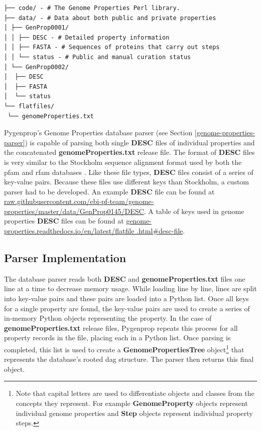\begin{verbatim}
├── code/ - # The Genome Properties Perl library.
├── data/ - # Data about both public and private properties
│ ├── GenProp0001/
│ │ ├── DESC - # Detailed property information
│ │ ├── FASTA - # Sequences of proteins that carry out steps
│ │ └── status - # Public and manual curation status
│ └── GenProp0002/
│  ├── DESC
│  ├── FASTA
│  └── status
└── flatfiles/
 └── genomeProperties.txt
\end{verbatim}

Pygenprop's Genome Properties database parser (see Section 
\ref{genome-properties-parser}) is capable of parsing both single \textbf{DESC} 
files of individual properties and the concatenated 
\textbf{genomeProperties.txt} release file. The format of \textbf{DESC} files is 
very similar to the Stockholm sequence alignment format used by both the 
\gls{pfam} and \gls{rfam} databases \cite{bateman2004pfam, griffiths2003rfam}. Like 
these file types, \textbf{DESC} files consist of a series of key-value pairs. 
Because these files use different keys than Stockholm, a custom parser had to be 
developed. An example \textbf{DESC} file can be found at 
\href{http://raw.githubusercontent.com/ebi-pf-team/genome-properties/master/data/GenProp0145/DESC}{raw.githubusercontent.com/ebi-pf-team/genome-properties/master/data/GenProp0145/DESC}. 
A table of keys used in  genome properties \textbf{DESC} files can be found at 
\href{https://genome-properties.readthedocs.io/en/latest/flatfile.html#desc-file}{genome-properties.readthedocs.io/en/latest/flatfile .html\#desc-file}.

\subsection{Parser Implementation}

The database parser reads both \textbf{DESC} and \textbf{genomeProperties.txt} 
files one line at a time to decrease memory usage. While loading line by line, 
lines are split into key-value pairs and these pairs are loaded into a Python 
list. Once all keys for a single property are found, the key-value pairs are 
used to create a series of in-memory Python objects representing the property. 
In the case of \textbf{genomeProperties.txt} release files, Pygenprop repeats 
this process for all property records in the file, placing each in a Python 
list.  Once parsing is completed, this list is used to create a 
\textbf{GenomePropertiesTree} object\footnote{Note that capital letters are used 
to differentiate objects and classes from the concepts they represent. For 
example \textbf{GenomeProperty} objects represent individual genome properties 
and \textbf{Step} objects represent individual property steps.} that represents 
the database's rooted \gls{dag} structure. The parser then returns this final 
object.


